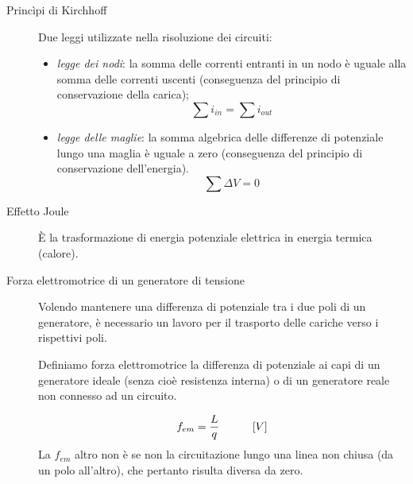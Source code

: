 \documentclass[a4paper,11pt,italian]{article}
\begin{document}
\begin{description}
  \item[Princìpi di Kirchhoff] 
  Due leggi utilizzate nella risoluzione dei circuiti:
  \begin{itemize}
    \item \emph{legge dei nodi}: la somma delle correnti entranti in un nodo è uguale alla somma delle correnti uscenti (conseguenza del principio di conservazione della carica);
    \[ \sum i_{in} = \sum i_{out} \]
    \item \emph{legge delle maglie}: la somma algebrica delle differenze di potenziale lungo una maglia è uguale a zero (conseguenza del principio di conservazione dell'energia).
    \[ \sum \Delta V = 0\]
  \end{itemize}


  \item[Effetto Joule] 
  È la trasformazione di energia potenziale elettrica in energia termica (calore).   %

  \item[Forza elettromotrice di un generatore di tensione] 
  Volendo mantenere una differenza di potenziale tra i due poli di un generatore, è necessario un lavoro per il trasporto delle cariche verso i rispettivi poli.
  
  Definiamo forza elettromotrice la differenza di potenziale ai capi di un generatore ideale (senza cioè resistenza interna) o di un generatore reale non connesso ad un circuito.
\begin{soloscientifico} %
  \[ f_{em} = \frac{L}{q} \hspace*{3em} [V] \]
  La $ f_{em} $ altro non è se non la circuitazione lungo una linea non chiusa (da un polo all'altro), che pertanto risulta diversa da zero.
  

\end{soloscientifico}
\end{description}
\end{document}
